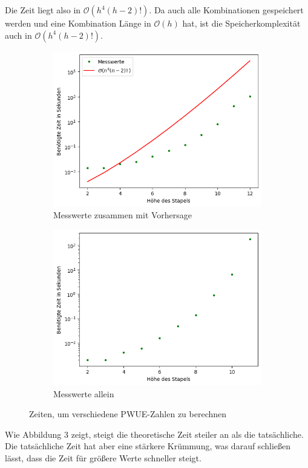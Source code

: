 \documentclass[a4paper,10pt,ngerman]{scrartcl}
\begin{document}
  Die Zeit liegt also in $\mathcal{O}(h^4(h-2)!)$. Da auch alle Kombinationen gespeichert werden und eine Kombination Länge in $\mathcal{O}(h)$ hat,
  ist die Speicherkomplexität auch in $\mathcal{O}(h^4(h-2)!)$. \\
  \begin{figure}
    \centering
    \begin{subfigure}{.5\textwidth}
      \centering
      \includegraphics[width=1\linewidth]{pwue-hoehe-bigo.png}
      \caption{Messwerte zusammen mit Vorhersage}
      \label{fig:sub1}
    \end{subfigure}%
    \begin{subfigure}{.5\textwidth}
      \centering
      \includegraphics[width=1\linewidth]{pwue-hoehe.png}
      \caption{Messwerte allein}
      \label{fig:sub2}
    \end{subfigure}
    \caption{Zeiten, um verschiedene PWUE-Zahlen zu berechnen}
    \label{fig:test}
  \end{figure}
  Wie Abbildung 3 zeigt, steigt die theoretische Zeit steiler an als die tatsächliche. Die tatsächliche Zeit hat aber eine stärkere Krümmung, was darauf
  schließen lässt, dass die Zeit für größere Werte schneller steigt.
\end{document}
